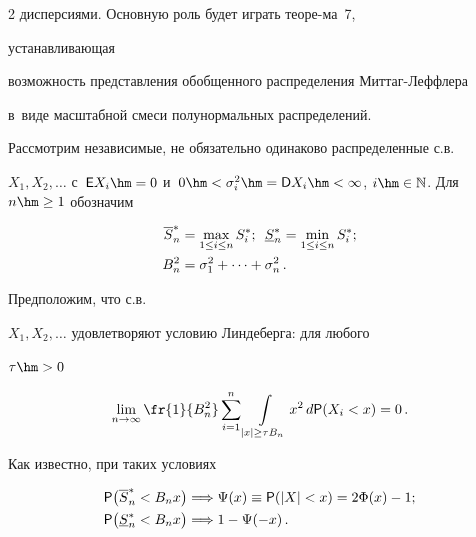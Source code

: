 \begin{multicols}{2}
{дис\-пер\-си\-ями}. Основную роль будет играть теоре-\linebreak ма~7,


 уста\-нав\-ли\-ва\-ющая


возможность представления обобщен\-но\-го распределения Мит\-таг-Леф\-фле\-ра


в~виде масштабной смеси полунормальных распределений.





Рассмотрим независимые, не обязательно одинаково распределенные с.в.\


 $X_1,X_2,\ldots $ с~${\sf E}X_i\hm=0$ и~$0\hm<\sigma^2_i\hm=


 {\sf D}X_i\hm<\infty$, $i\hm\in\mathbb{N}$. Для $n\hm\ge1$ обозначим 


\begin{align*}


 \overline S^*_n&=\max\limits_{1\le i\le n}S^*_i;\enskip 


 \underline S^*_n=\min\limits_{1\le i\le


n}S^*_i;\\


B_n^2&=\sigma_1^2+\cdots+\sigma_n^2\,.


\end{align*}





Предположим, что с.в.\


 $X_1,X_2,\ldots $ удовлетворяют условию Линдеберга: для любого


$\tau\hm>0$


\begin{equation}


\lim\limits_{n\to\infty}\fr{1}{B^2_n}\sum\limits_{i=1}^{n}\int\limits_{|x|\ge\tau


B_n} x^2\,d{\sf P}(X_i<x)=0\,.\label{e17-kgz}


\end{equation}


Как известно, при таких условиях 


\begin{align*}


{\sf P}\big(\overline S^*_n<B_nx\big)&\Longrightarrow \Psi(x)\equiv{\sf P}


(|X|<x)=2\Phi(x)-1;\\


{\sf P}\big(\underline


S^*_n<B_nx\big)&\Longrightarrow 1-\Psi(-x)\,.



\end{align*}
\end{multicols}
